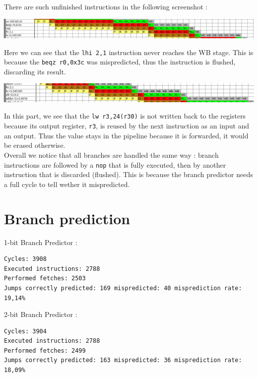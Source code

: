\documentclass[a4paper]{report}
\begin{document}
There are such unfinished instructions in the following screenshot :

\begin{center}
	\includegraphics[width=\textwidth-2cm]{images/pipeline_no_writeback_after_branching.png}
\end{center}

Here we can see that the \texttt{lhi 2,1} instruction never reaches the WB stage. This is because the
\texttt{beqz~r0,0x3c} was mispredicted, thus the instruction is flushed, discarding its result.

\begin{center}
	\includegraphics[width=\textwidth-2cm]{images/pipeline_no_writeback_after_forwarding.png}
\end{center}

In this part, we see that the \texttt{lw~r3,24(r30)} is not written back to the registers because its output
register, \texttt{r3}, is reused by the next instruction as an input and an output. Thus the value stays in
the pipeline because it is forwarded, it would be erased otherwise.
\mbox{}\\

Overall we notice that all branches are handled the same way : branch instructions are followed by a
\texttt{nop} that is fully executed, then by another instruction that is discarded (flushed). This is because
the branch predictor needs a full cycle to tell wether it mispredicted.

\section{Branch prediction}

1-bit Branch Predictor :
\begin{verbatim}
Cycles: 3908
Executed instructions: 2788
Performed fetches: 2503
Jumps correctly predicted: 169 mispredicted: 40 misprediction rate: 19,14%
\end{verbatim}
2-bit Branch Predictor :
\begin{verbatim}
Cycles: 3904
Executed instructions: 2788
Performed fetches: 2499
Jumps correctly predicted: 163 mispredicted: 36 misprediction rate: 18,09%
\end{verbatim}
\end{document}
